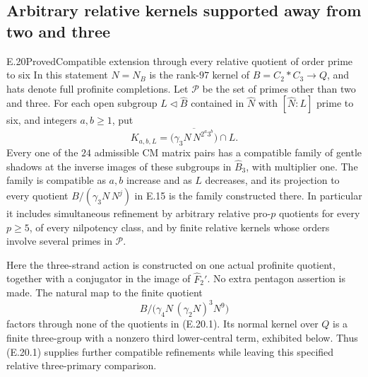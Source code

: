 \subsection{Arbitrary relative kernels supported away from two and three}

\begin{statement}{E.20}{Proved}{Compatible extension through every relative quotient of order prime to six}
In this statement $N=N_B$ is the rank-$97$ kernel of
$B=C_2*C_3\to Q$, and hats denote full profinite completions.
Let $\mathscr P$ be the set of primes other than two and three.
For each open subgroup $L\triangleleft\widehat B$ contained
in $\widehat N$ with $[\widehat N:L]$ prime to six, and
integers $a,b\geq1$, put
\[
 K_{a,b,L}=
 \bigl(\overline{\gamma_3N\,N^{2^a3^b}}\bigr)\cap L.
 \tag{E.20.1}
\]
Every one of the $24$ admissible CM matrix pairs has a
compatible family of gentle shadows at the inverse images
of these subgroups in $\widehat B_3$, with multiplier one.
The family is compatible as $a,b$ increase and as $L$
decreases, and its projection to every quotient
$B/(\gamma_3N\,N^j)$ in E.15 is the family constructed
there. In particular it
includes simultaneous refinement by arbitrary relative
pro-$p$ quotients for every $p\geq5$, of every nilpotency
class, and by finite relative kernels whose orders involve
several primes in $\mathscr P$.

Here the three-strand action is constructed on one actual
profinite quotient, together with a conjugator in the image
of $\widehat F_2'$. No extra pentagon assertion is made.
The natural map to the finite quotient
\[
 B/\bigl(\gamma_4N\,(\gamma_2N)^3N^9\bigr)
 \tag{E.20.2}
\]
factors through none of the quotients in (E.20.1).
Its normal kernel over $Q$ is a finite three-group with
a nonzero third lower-central term, exhibited below.
Thus (E.20.1) supplies further compatible refinements while
leaving this specified relative three-primary comparison.
\end{statement}
